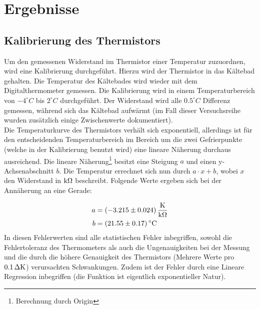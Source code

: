 \section{Ergebnisse}

\subsection{Kalibrierung des Thermistors}
Um den gemessenen Widerstand im Thermistor einer Temperatur zuzuordnen, wird eine Kalibrierung durchgeführt. Hierzu wird der Thermistor in das Kältebad gehalten. Die Temperatur des Kältebades wird wieder mit dem Digitalthermometer gemessen. Die Kalibrierung wird in einem Temperaturbereich von $-4^\circ C$ bis $2^\circ C$ durchgeführt. Der Widerstand wird alle $0.5^\circ C$ Differenz gemessen, während sich das Kältebad aufwärmt (im Fall dieser Versuchsreihe wurden zusätzlich einige Zwischenwerte dokumentiert).\\
Die Temperaturkurve des Thermistors verhält sich exponentiell, allerdings ist für den entscheidenden Temperaturbereich im Bereich um die zwei Gefrierpunkte (welche in der Kalibrierung benutzt wird) eine lineare Näherung durchaus ausreichend. Die lineare Näherung\footnote{Berechnung durch Origin} besitzt eine Steigung $a$ und einen y-Achsenabschnitt $b$. Die Temperatur errechnet sich nun durch $a \cdot x + b$, wobei $x$ den Widerstand in $\unit[]{k\Omega}$ beschreibt. Folgende Werte ergeben sich bei der Annäherung an eine Gerade:

\begin{align*}
a &= \unit[(-3.215 \pm 0.024)]{\frac{K}{k\Omega}}\\
b &= \unit[(21.55 \pm 0.17)]{^\circ C}
\end{align*}
%
In diesen Fehlerwerten sind alle statistischen Fehler inbegriffen, sowohl die Fehlertoleranz des Thermometers als auch die Ungenauigkeiten bei der Messung und die durch die höhere Genauigkeit des Thermistors (Mehrere Werte pro $\unit[0.1]{\Delta K}$) verursachten Schwankungen. Zudem ist der Fehler durch eine Lineare Regression inbegriffen (die Funktion ist eigentlich exponentieller Natur).


